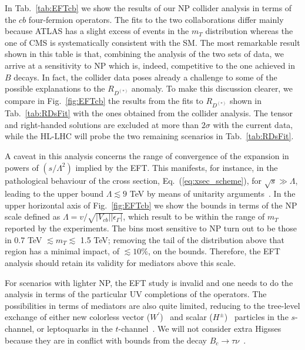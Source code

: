 \documentclass[%
 reprint,
 superscriptaddress,preprintnumbers,
 amsmath,amssymb,
 aps,
]{revtex4-1}
\begin{document}
In Tab.~\ref{tab:EFTcb} we show the results of our NP collider analysis in terms of the $cb$ four-fermion operators. The fits to the two collaborations differ mainly because ATLAS has a slight excess of events in the $m_T$ distribution whereas the one of CMS is systematically consistent with the SM. The most remarkable result shown in this table is that, combining the analysis of the two sets of data, we arrive at a sensitivity to NP which is, indeed, competitive to the one achieved in $B$ decays. In fact, the collider data poses already a challenge to some of the possible explanations to the $R_{D^{(*)}}$ anomaly. To make this discussion clearer, we compare in Fig.~\ref{fig:EFTcb} the results from the fits to $R_{D^{(*)}}$ shown in Tab.~\ref{tab:RDsFit} with the ones obtained from the collider analysis. The tensor and right-handed solutions are excluded  at more than $2\sigma$ with the current data, while the HL-LHC will probe the two remaining scenarios in Tab.~\ref{tab:RDsFit}.                   

A caveat in this analysis concerns the range of convergence of the expansion in powers of $(s/\Lambda^2)$ implied by the EFT. This manifests, for instance, in the pathological behaviour of the cross section, Eq.~(\ref{eq:xsec_scheme}), for $\sqrt{s}\gg \Lambda$, leading to the upper bound $\Lambda\lesssim9$ TeV by means of unitarity arguments~\cite{DiLuzio:2017chi}. In the upper horizontal axis of Fig.~\ref{fig:EFTcb} we show the bounds in terms of the NP scale defined as $\Lambda=v/\sqrt{|V_{cb}||\epsilon_\Gamma|}$, which result to be within the range of $m_T$ reported by the experiments. The bins most sensitive to NP turn out to be those in 0.7 TeV $\lesssim m_T \lesssim$ 1.5 TeV; removing the tail of the distribution above that region has a minimal impact, of $\lesssim10\%$, on the bounds. Therefore, the EFT analysis should retain its validity for mediators above this scale.

For scenarios with lighter NP, the EFT study is invalid and one needs to do the analysis in terms of the particular UV completions of the operators. The possibilities in terms of mediators are also quite limited, reducing to the tree-level exchange of either new colorless vector ($W^\prime$)~\cite{Greljo:2015mma,Boucenna:2016wpr,Megias:2017ove,He:2017bft,Matsuzaki:2017bpp,Greljo:2018ogz,Asadi:2018wea} and scalar ($H^\pm$)~\cite{Tanaka:1994ay,Celis:2012dk,Celis:2016azn,Iguro:2017ysu,Fraser:2018aqj} particles in the $s$-channel, or leptoquarks in the $t$-channel~\cite{Sakaki:2013bfa,Alonso:2015sja,Barbieri:2015yvd,Freytsis:2015qca,Fajfer:2015ycq,Li:2016vvp,Barbieri:2016las,Becirevic:2016yqi,Crivellin:2017zlb,Cai:2017wry,Assad:2017iib,DiLuzio:2017vat,Bordone:2017bld,Barbieri:2017tuq,Marzocca:2018wcf,Greljo:2018tuh,Blanke:2018sro,Bordone:2018nbg,Becirevic:2018afm,DiLuzio:2018zxy,Angelescu:2018tyl,Heeck:2018ntp,Robinson:2018gza,Azatov:2018kzb}. We will not consider extra Higsses because they are in conflict with bounds from the decay $B_c\to\tau\nu$~\cite{Alonso:2016oyd,Akeroyd:2017mhr}. 
\end{document}

